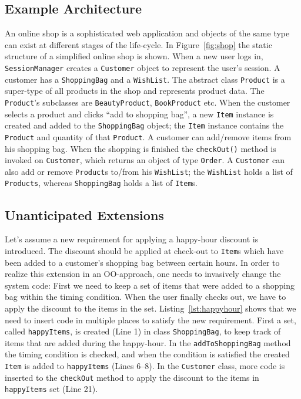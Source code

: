 \subsection{Example Architecture}
An online shop is a sophisticated web application and objects of the same type can exist at different stages of the life-cycle. In Figure~\ref{fig:shop} the static structure of a simplified online shop is shown. When a new user logs in, \texttt{SessionManager} creates a \texttt{Customer} object to represent the user's session. A customer has a \texttt{ShoppingBag} and a \texttt{WishList}. The abstract class \texttt{Product} is a super-type of all products in the shop and represents product data. The \texttt{Product}'s subclasses are \texttt{BeautyProduct}, \texttt{BookProduct} etc. When the customer selects a product and clicks ``add to shopping bag'', a new \texttt{Item} instance is created and added to the \texttt{ShoppingBag} object; the \texttt{Item} instance contains the \texttt{Product} and quantity of that \texttt{Product}. A customer can add/remove items from his shopping bag. When the shopping is finished the \texttt{checkOut()} method is invoked on \texttt{Customer}, which returns an object of type \texttt{Order}. A \texttt{Customer} can also add or remove \texttt{Product}s to/from his \texttt{WishList}; the \texttt{WishList} holds a list of \texttt{Products}, whereas \texttt{ShoppingBag} holds a list of \texttt{Item}s.

\subsection{Unanticipated Extensions}
Let's assume a new requirement for applying a happy-hour discount is introduced. The discount should be applied at check-out to \texttt{Item}s which have been added to a customer's shopping bag between certain hours.
In order to realize this extension in an OO-approach, one needs to invasively change the system code: First we need to keep a set of items that were added to a shopping bag within the timing condition. When the user finally checks out, we have to apply the discount to the items in the set. Listing~\ref{lst:happyhour} shows that we need to insert code in multiple places to satisfy the new requirement. First a set, called \texttt{happyItems}, is created (Line 1) in class \texttt{ShoppingBag}, to keep track of items that are added during the happy-hour. In the \texttt{addToShoppingBag} method the timing condition is checked, and when the condition is satisfied the created \texttt{Item} is added to \texttt{happyItems} (Lines 6--8).  In the \texttt{Customer} class, more code is inserted to the \texttt{checkOut} method to apply the discount to the items in \texttt{happyItems} set (Line 21). 

